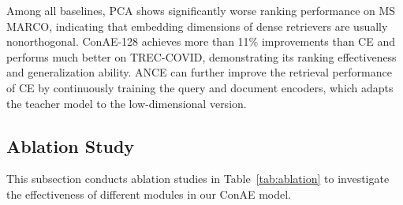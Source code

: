 \documentclass[11pt]{article}
\begin{document}
Among all baselines, PCA shows significantly worse ranking performance on MS MARCO, indicating that embedding dimensions of dense retrievers are usually nonorthogonal. ConAE-128 achieves more than 11\% improvements than CE and performs much better on TREC-COVID, demonstrating its ranking effectiveness and generalization ability. ANCE can further improve the retrieval performance of CE by continuously training the query and document encoders, which adapts the teacher model to the low-dimensional version.



\subsection{Ablation Study}\label{sec:ablation}
This subsection conducts ablation studies in Table~\ref{tab:ablation} to investigate the effectiveness of different modules in our ConAE model.

\begin{table}
\centering
\small
{}
\caption{Retrieval Performance of Different Ablation Models. ConAE w/o Decoder and ConAE w/o KL use  and  to train the distillation models.}
\label{tab:ablation}
\end{table}
\end{document}
